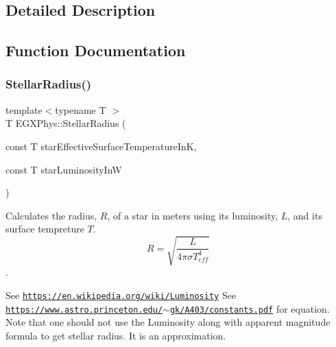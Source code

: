 \subsection{Detailed Description}


\subsection{Function Documentation}
\mbox{\label{group___e_g_x_phys-_stellar_radius_ga612cd22c37341a1864cd2fc5c858e18e}} 
\subsubsection{\texorpdfstring{Stellar\+Radius()}{StellarRadius()}}
{\footnotesize\ttfamily template$<$typename T $>$ \\
T E\+G\+X\+Phys\+::\+Stellar\+Radius (\begin{DoxyParamCaption}\item[{const T}]{star\+Effective\+Surface\+Temperature\+InK,  }\item[{const T}]{star\+Luminosity\+InW }\end{DoxyParamCaption})}



Calculates the radius, $R$, of a star in meters using its luminosity, $L$, and its surface tempreture $T$. \[R=\sqrt{\dfrac{L}{4\pi \sigma T_{eff}^4}}\]. 

See \href{https://en.wikipedia.org/wiki/Luminosity}{\tt https\+://en.\+wikipedia.\+org/wiki/\+Luminosity} See \href{https://www.astro.princeton.edu/~gk/A403/constants.pdf}{\tt https\+://www.\+astro.\+princeton.\+edu/$\sim$gk/\+A403/constants.\+pdf} for equation. Note that one should not use the Luminosity along with apparent magnitude formula to get stellar radius. It is an approximation.


